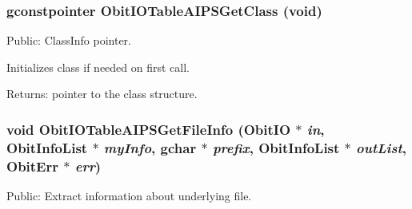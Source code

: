 \subsubsection{\setlength{\rightskip}{0pt plus 5cm}gconstpointer Obit\-IOTable\-AIPSGet\-Class (void)}\label{ObitIOTableAIPS_8c_a10}


Public: Class\-Info pointer. 

Initializes class if needed on first call. \begin{Desc}
\item[Returns:]pointer to the class structure. \end{Desc}
\subsubsection{\setlength{\rightskip}{0pt plus 5cm}void Obit\-IOTable\-AIPSGet\-File\-Info ({\bf Obit\-IO} $\ast$ {\em in}, {\bf Obit\-Info\-List} $\ast$ {\em my\-Info}, gchar $\ast$ {\em prefix}, {\bf Obit\-Info\-List} $\ast$ {\em out\-List}, {\bf Obit\-Err} $\ast$ {\em err})}\label{ObitIOTableAIPS_8c_a27}


Public: Extract information about underlying file. 

